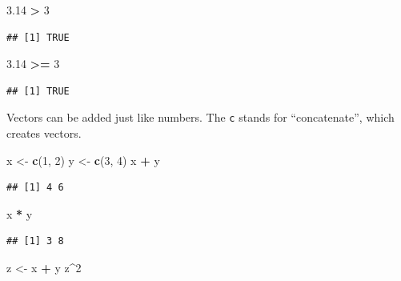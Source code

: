 \documentclass[openany]{book}
\newenvironment{Shaded}{\begin{snugshade}}{\end{snugshade}}
\newcommand{\DecValTok}[1]{\textcolor[rgb]{0.00,0.00,0.81}{#1}}
\newcommand{\FloatTok}[1]{\textcolor[rgb]{0.00,0.00,0.81}{#1}}
\newcommand{\KeywordTok}[1]{\textcolor[rgb]{0.13,0.29,0.53}{\textbf{#1}}}
\newcommand{\NormalTok}[1]{#1}
\newcommand{\OperatorTok}[1]{\textcolor[rgb]{0.81,0.36,0.00}{\textbf{#1}}}
\newcommand{\StringTok}[1]{\textcolor[rgb]{0.31,0.60,0.02}{#1}}
\begin{document}
\begin{Shaded}
\begin{Highlighting}[]
\FloatTok{3.14} \OperatorTok{>}\StringTok{ }\DecValTok{3}
\end{Highlighting}
\end{Shaded}

\begin{verbatim}
## [1] TRUE
\end{verbatim}

\begin{Shaded}
\begin{Highlighting}[]
\FloatTok{3.14} \OperatorTok{>=}\StringTok{ }\DecValTok{3}
\end{Highlighting}
\end{Shaded}

\begin{verbatim}
## [1] TRUE
\end{verbatim}

Vectors can be added just like numbers. The \texttt{c} stands for ``concatenate'', which
creates vectors.

\begin{Shaded}
\begin{Highlighting}[]
\NormalTok{x <-}\StringTok{ }\KeywordTok{c}\NormalTok{(}\DecValTok{1}\NormalTok{, }\DecValTok{2}\NormalTok{)}
\NormalTok{y <-}\StringTok{ }\KeywordTok{c}\NormalTok{(}\DecValTok{3}\NormalTok{, }\DecValTok{4}\NormalTok{)}
\NormalTok{x }\OperatorTok{+}\StringTok{ }\NormalTok{y}
\end{Highlighting}
\end{Shaded}

\begin{verbatim}
## [1] 4 6
\end{verbatim}

\begin{Shaded}
\begin{Highlighting}[]
\NormalTok{x }\OperatorTok{*}\StringTok{ }\NormalTok{y}
\end{Highlighting}
\end{Shaded}

\begin{verbatim}
## [1] 3 8
\end{verbatim}

\begin{Shaded}
\begin{Highlighting}[]
\NormalTok{z <-}\StringTok{ }\NormalTok{x }\OperatorTok{+}\StringTok{ }\NormalTok{y}
\NormalTok{z}\OperatorTok{^}\DecValTok{2}
\end{Highlighting}
\end{Shaded}
\end{document}
